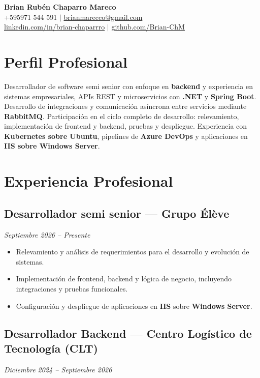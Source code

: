 \documentclass[10.5pt,a4paper]{article}
\newcommand{\role}[2]{%
  \subsection{#1}
  {\small\color{midgray}\textit{#2}}\par\vspace{2pt}
}
\begin{document}
\begin{center}
  {\huge\bfseries\color{accent} Brian Rubén Chaparro Mareco}\\[5pt]
  {\small
    +595971 544 591 \quad $\vert$ \quad
    \href{mailto:brianmarecco@gmail.com}{brianmarecco@gmail.com}\\[2pt]
    \href{https://linkedin.com/in/brian-chaparrro}{linkedin.com/in/brian-chaparrro} \quad $\vert$ \quad
    \href{https://github.com/Brian-ChM}{github.com/Brian-ChM}
  }
\end{center}

\vspace{0pt}

\section*{Perfil Profesional}
Desarrollador de software semi senior con enfoque en \textbf{backend} y experiencia en sistemas empresariales, APIs REST y microservicios con \textbf{.NET} y \textbf{Spring Boot}. Desarrollo de integraciones y comunicación asíncrona entre servicios mediante \textbf{RabbitMQ}. Participación en el ciclo completo de desarrollo: relevamiento, implementación de frontend y backend, pruebas y despliegue. Experiencia con \textbf{Kubernetes sobre Ubuntu}, pipelines de \textbf{Azure DevOps} y aplicaciones en \textbf{IIS sobre Windows Server}.

\section*{Experiencia Profesional}

\role{Desarrollador semi senior --- Grupo Élève}{Septiembre 2026 -- Presente}

\begin{itemize}
  \item Relevamiento y análisis de requerimientos para el desarrollo y evolución de sistemas.
  \item Implementación de frontend, backend y lógica de negocio, incluyendo integraciones y pruebas funcionales.
  \item Configuración y despliegue de aplicaciones en \textbf{IIS} sobre \textbf{Windows Server}.
\end{itemize}

\role{Desarrollador Backend --- Centro Logístico de Tecnología (CLT)}{Diciembre 2024 -- Septiembre 2026}
\end{document}
